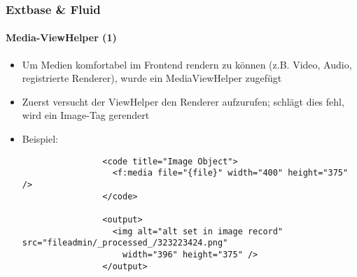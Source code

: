 
\begin{frame}[fragile]
	\frametitle{Extbase \& Fluid}
	\framesubtitle{Media-ViewHelper (1)}

	\lstset{basicstyle=\tiny\ttfamily}

	\begin{itemize}

		\item Um Medien komfortabel im Frontend rendern zu können (z.B. Video, Audio,
			registrierte Renderer), wurde ein MediaViewHelper zugefügt

		\item Zuerst versucht der ViewHelper den Renderer aufzurufen;
			schlägt dies fehl, wird ein Image-Tag gerendert

		\item Beispiel:

			\begin{lstlisting}
				<code title="Image Object">
				  <f:media file="{file}" width="400" height="375" />
				</code>

				<output>
				  <img alt="alt set in image record" src="fileadmin/_processed_/323223424.png"
				    width="396" height="375" />
				</output>
			\end{lstlisting}

	\end{itemize}

\end{frame}


